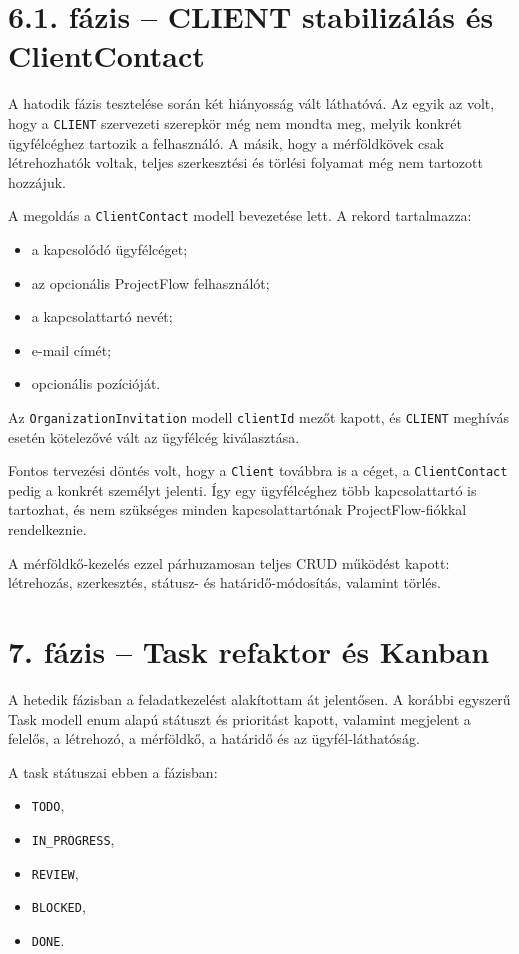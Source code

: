 \documentclass[11pt,a4paper]{report}
\begin{document}
    \section{6.1. fázis -- CLIENT stabilizálás és ClientContact}

    A hatodik fázis tesztelése során két hiányosság vált láthatóvá. Az egyik az
    volt, hogy a \texttt{CLIENT} szervezeti szerepkör még nem mondta meg, melyik
    konkrét ügyfélcéghez tartozik a felhasználó. A másik, hogy a mérföldkövek csak
    létrehozhatók voltak, teljes szerkesztési és törlési folyamat még nem tartozott
    hozzájuk.

    A megoldás a \texttt{ClientContact} modell bevezetése lett. A rekord
    tartalmazza:
    \begin{itemize}
        \item a kapcsolódó ügyfélcéget;
        \item az opcionális ProjectFlow felhasználót;
        \item a kapcsolattartó nevét;
        \item e-mail címét;
        \item opcionális pozícióját.
    \end{itemize}

    Az \texttt{OrganizationInvitation} modell \texttt{clientId} mezőt kapott,
    és \texttt{CLIENT} meghívás esetén kötelezővé vált az ügyfélcég kiválasztása.

    Fontos tervezési döntés volt, hogy a \texttt{Client} továbbra is a céget, a
    \texttt{ClientContact} pedig a konkrét személyt jelenti. Így egy ügyfélcéghez
    több kapcsolattartó is tartozhat, és nem szükséges minden kapcsolattartónak
    ProjectFlow-fiókkal rendelkeznie.

    A mérföldkő-kezelés ezzel párhuzamosan teljes CRUD működést kapott:
    létrehozás, szerkesztés, státusz- és határidő-módosítás, valamint törlés.

    \section{7. fázis -- Task refaktor és Kanban}

    A hetedik fázisban a feladatkezelést alakítottam át jelentősen. A korábbi
    egyszerű Task modell enum alapú státuszt és prioritást kapott, valamint
    megjelent a felelős, a létrehozó, a mérföldkő, a határidő és az
    ügyfél-láthatóság.

    A task státuszai ebben a fázisban:
    \begin{itemize}
        \item \texttt{TODO},
        \item \texttt{IN\_PROGRESS},
        \item \texttt{REVIEW},
        \item \texttt{BLOCKED},
        \item \texttt{DONE}.
    \end{itemize}
\end{document}
